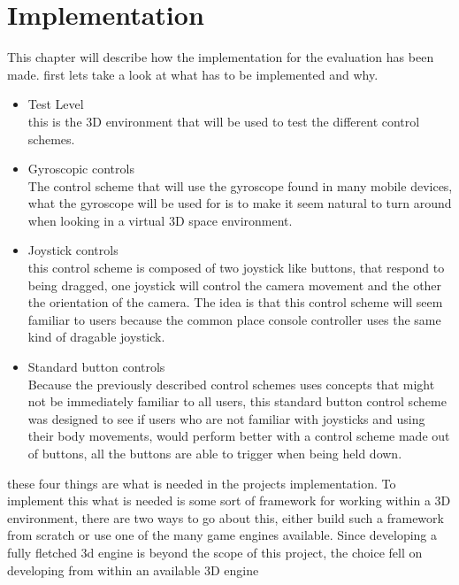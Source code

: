 \chapter{Implementation}
This chapter will describe how the implementation for the evaluation has been made. first lets take a look at what has to be implemented and why.
\begin{itemize}
\item Test Level\\
this is the 3D environment that will be used to test the different control schemes. 
\item Gyroscopic controls\\
The control scheme that will use the gyroscope found in many mobile devices, what the gyroscope will be used for is to make it seem natural to turn around when looking in a virtual 3D space environment. 
\item Joystick controls\\
this control scheme is composed of two joystick like buttons, that respond to being dragged, one joystick will control the camera movement and the other the orientation of the camera. The idea is that this control scheme will seem familiar%
to users because the common place console controller uses the same kind of dragable joystick.
\item Standard button controls\\
Because the previously described control schemes uses concepts that might not be immediately familiar to all users, this standard button control scheme was designed to see if users who are not familiar with joysticks and using their body movements, would perform better with a control scheme made out of buttons, all the buttons are able to trigger when being held down.
\end{itemize}
these four things are what is needed in the projects implementation. To implement this what is needed is some sort of framework for working within a 3D environment, there are two ways to go about this, either build such a framework from scratch or use one of the many game engines available. Since developing a fully fletched 3d engine is beyond the scope of this project, the choice fell on developing from within an available 3D engine
